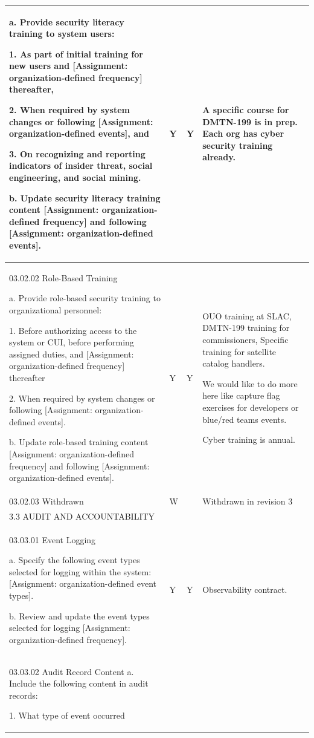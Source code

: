 \begin{longtable} {|p{}|p{}|p{}|p{} |}
{a. Provide security literacy training to system users:

1. As part of initial training for new users and [Assignment: organization-defined frequency] thereafter,

2. When required by system changes or following [Assignment: organization-defined events], and

3. On recognizing and reporting indicators of insider threat, social engineering, and social mining.

b. Update security literacy training content [Assignment: organization-defined frequency] and following [Assignment: organization-defined events].
}&{Y}&{Y}&{A specific course for DMTN-199 is in prep. Each org has cyber security training already.} \\ \hline
{03.02.02 Role-Based Training

a. Provide role-based security training to organizational personnel:

1. Before authorizing access to the system or CUI, before performing assigned duties, and [Assignment: organization-defined frequency] thereafter

2. When required by system changes or following [Assignment: organization- defined events].

b. Update role-based training content [Assignment: organization-defined frequency] and following [Assignment: organization-defined events].}&{Y}&{Y}&{OUO training at SLAC, DMTN-199 training for commissioners, Specific training for satellite catalog handlers.

We would like to do more here like capture flag exercises for developers or blue/red teams events.

Cyber training is annual.} \\ \hline
{03.02.03 Withdrawn}&{W}&{}&{Withdrawn in revision 3} \\ \hline
{3.3 AUDIT AND ACCOUNTABILITY}&&& \\ \hline
{03.03.01 Event Logging

a. Specify the following event types selected for logging within the system: [Assignment: organization-defined event types].

b. Review and update the event types selected for logging [Assignment: organization-defined frequency].}&{Y}&{Y}&{Observability contract.} \\ \hline
{03.03.02 Audit Record Content
a. Include the following content in audit records:

1. What type of event occurred

}
\end{longtable}
